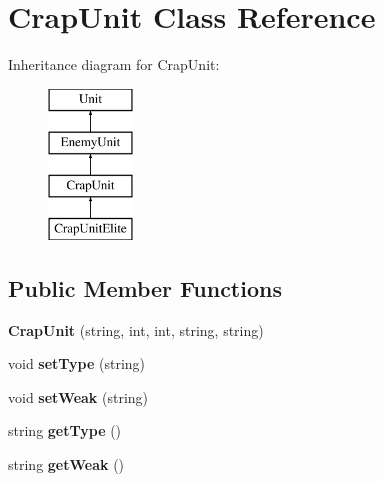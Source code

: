 \hypertarget{class_crap_unit}{}\section{Crap\+Unit Class Reference}
\label{class_crap_unit}
Inheritance diagram for Crap\+Unit\+:\begin{figure}[H]
\begin{center}
\leavevmode
\includegraphics[height=4.000000cm]{class_crap_unit}
\end{center}
\end{figure}
\subsection*{Public Member Functions}
\begin{DoxyCompactItemize}
\item 
\hypertarget{class_crap_unit_a2f1a878e3b26dd87a7a205289a4b2c24}{}{\bfseries Crap\+Unit} (string, int, int, string, string)\label{class_crap_unit_a2f1a878e3b26dd87a7a205289a4b2c24}

\item 
\hypertarget{class_crap_unit_a417bd87e2d41efef62c125fa3c8e2c1a}{}void {\bfseries set\+Type} (string)\label{class_crap_unit_a417bd87e2d41efef62c125fa3c8e2c1a}

\item 
\hypertarget{class_crap_unit_aa4a586bf92c873126bc80376beef952c}{}void {\bfseries set\+Weak} (string)\label{class_crap_unit_aa4a586bf92c873126bc80376beef952c}

\item 
\hypertarget{class_crap_unit_a7bd065772872b94fb404b8a546420fab}{}string {\bfseries get\+Type} ()\label{class_crap_unit_a7bd065772872b94fb404b8a546420fab}

\item 
\hypertarget{class_crap_unit_a93ead139bd06781739523304e5a63e21}{}string {\bfseries get\+Weak} ()\label{class_crap_unit_a93ead139bd06781739523304e5a63e21}

\end{DoxyCompactItemize}
